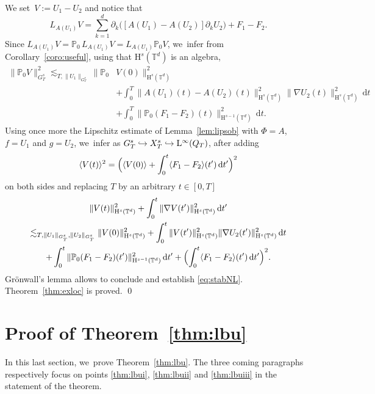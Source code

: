 \documentclass[JEP,XML,SOM,Unicode,published]{cedram}
\newcommand\hto{\mathrel{\lhook\joinrel\to}}
\theoremstyle{definition}
\newcommand\T{\mathbb{T}}
\newcommand\dd{\mathrm{d}}
\renewcommand\H{\mathrm{H}}
\renewcommand\L{\mathrm{L}}
\begin{document}
We set~$V:=U_1-U_2$ and notice that
\[
L_{A(U_1) }V=\sum_{k=1}^d\partial_k\bigl([A(U_1)-A(U_2)]\partial_k U_2\bigr) + F_1-F_2.
\]
Since $L_{A(U_1) }V = \mathbb{P}_0\,L_{A(U_1) }V = L_{A(U_1)}\mathbb{P}_0 V$, we~infer from Corollary~\ref{coro:useful}, using that $\H^s(\T^d)$ is an algebra,
\[
\begin{aligned}
\|\mathbb{P}_0 V \|_{G_T^s}^2\lesssim_{T, \|U_1\|_{G_T^s}} \|\mathbb{P}_0& V(0)\|_{\H^s(\T^d)}^2\\
& + \int_0^T \|A(U_1)(t)-A(U_2)(t)\|_{\H^s(\T^d)}^2\|\nabla U_2(t)\|_{\H^{s}(\T^d)}^2 \,\dd t \\
& + \int_0^T \|{\mathbb P}_0(F_1-F_2) (t)\|_{\H^{s-1}(\T^d)}^2 \, \dd t.
\end{aligned}
\]
Using once more the Lipschitz estimate of Lemma~\ref{lem:lipsob} with $\Phi=A$, $f=U_1$ and $g=U_2$, we~infer as $G_T^s\hto X_T^s \hto \L^\infty(Q_T)$, after adding
\[
\langle V(t)\rangle^2 = \Bigl(\langle V(0)\rangle+ \int_0^t \langle F_1-F_2 \rangle (t') \, \dd t'\Bigr)^2
\]
on both sides and replacing $T$ by an arbitrary $t\in[0,T]$
\begin{multline*}
\|V(t)\|_{\H^s(\T^d)}^2 + \int_0^t \|\nabla V(t')\|_{\H^s(\T^d)}^2 \,\dd t'\\
\lesssim_{T,\|U_1\|_{G_T^s},\|U_2\|_{G_T^s}} \|V(0)\|_{\H^s(\T^d)}^2+ \int_0^t \|V(t')\|_{\H^s(\T^d)}^2\|\nabla U_2(t')\|_{\H^{s}(\T^d)}^2 \,\dd t \\
+ \int_0^t \|{\mathbb P}_0(F_1-F_2) (t')\|_{\H^{s-1}(\T^d)}^2 \, \dd t ' +\Bigl(\int_0^t \langle F_1-F_2 \rangle (t') \, \dd t'\Bigr)^2.
\end{multline*}
Grönwall's lemma allows to conclude and establish \eqref{eq:stabNL}. Theorem~\ref{thm:exloc}
is proved. \qed

\section{Proof of Theorem~\ref{thm:lbu}}\label{prooflbu}

In this last section, we~prove Theorem~\ref{thm:lbu}. The three coming paragraphs respectively focus on points \eqref{thm:lbui}, \eqref{thm:lbuii} and \eqref{thm:lbuiii} in the statement of the theorem.
\end{document}
